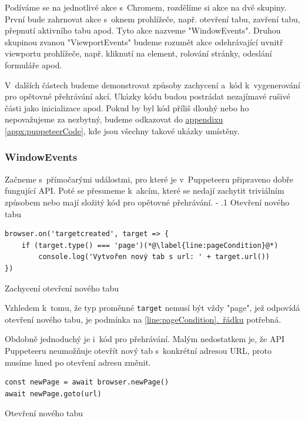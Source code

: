 \documentclass[12pt, a4paper, twoside]{article}
\makeatletter
\newcommand{\codefigureSpacing}{1.2}
\newcommand{\refAddedText}[3]{\hyperref[#1]{#2\ref{#1}#3}}
\newcommand{\lineref}[2]{\refAddedText{#1}{}{.~#2}}
\renewcommand\paragraph{%
	\@startsection{subparagraph}{5}{0mm}%
	{-\baselineskip}%
	{.1\baselineskip}%
	{\normalfont\normalsize\bfseries}}
\makeatother
\begin{document}
	Podíváme se na jednotlivé akce s~Chromem, rozdělíme si akce na dvě skupiny. První bude zahrnovat akce s~oknem prohlížeče, např. otevření tabu, zavření tabu, přepnutí aktivního tabu apod. Tyto akce nazveme "WindowEvents". Druhou skupinou zvanou "ViewportEvents" budeme rozumět akce odehrávající uvnitř viewportu prohlížeče, např. kliknutí na element, rolování stránky, odeslání formuláře apod.
	
	V~dalších částech budeme demonstrovat způsoby zachycení a~kód k~vygenerování pro opětovné přehrávání akcí. Ukázky kódu budou postrádat nezajímavé rušivé části jako inicializace apod. Pokud by byl kód příliš dlouhý nebo ho nepovažujeme za nezbytný, budeme odkazovat do \refAddedText{appx:puppeteerCode}{appendixu }{}, kde jsou všechny takové ukázky umístěny.
	\subsubsection{WindowEvents}
	Začneme s~přímočarými událostmi, pro které je v~Puppeteeru připraveno dobře fungující API. Poté se přesuneme k~akcím, které se nedají zachytit triviálním způsobem nebo mají složitý kód pro opětovné přehrávání.
	\paragraph{Otevření nového tabu}
	\begin{codefigure}[H]
		\renewcommand\baselinestretch{\codefigureSpacing}
		\begin{lstlisting}[style=MyJavaScript]
browser.on('targetcreated', target => {
	if (target.type() === 'page')(*@\label{line:pageCondition}@*)
		console.log('Vytvořen nový tab s url: ' + target.url())
})
		\end{lstlisting}
	\caption{Zachycení otevření nového tabu}
	\label{codefig:openNewTab}
	\end{codefigure}
	Vzhledem k~tomu, že typ proměnné \texttt{target} nemusí být vždy "page", jež odpovídá otevření nového tabu, je podmínka na \lineref{line:pageCondition}{řádku} potřebná.
	
	Obdobně jednoduchý je i~kód pro přehrávání. Malým nedostatkem je, že API Puppeteeru neumožňuje otevřít nový tab s~konkrétní adresou URL, proto musíme hned po otevření adresu změnit.
	\begin{codefigure}[H]
		\renewcommand\baselinestretch{\codefigureSpacing}
		\begin{lstlisting}[style=MyJavaScript]
const newPage = await browser.newPage()
await newPage.goto(url)
		\end{lstlisting}
	\caption{Otevření nového tabu}
	\end{codefigure}
	\newpage
\end{document}

